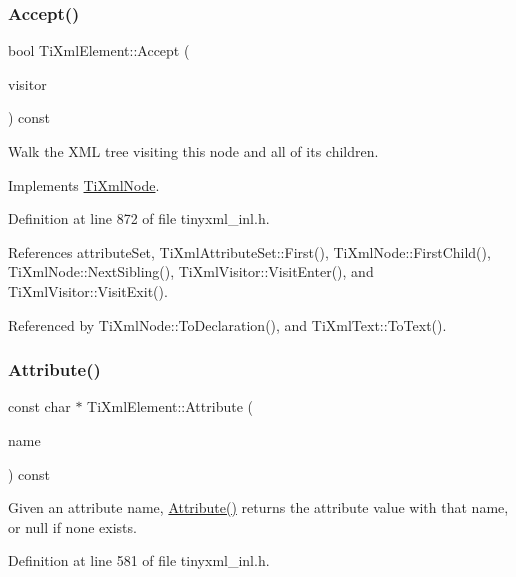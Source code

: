 \subsubsection{\texorpdfstring{Accept()}{Accept()}}
{\footnotesize\ttfamily bool Ti\+Xml\+Element\+::\+Accept (\begin{DoxyParamCaption}\item[{\hyperlink{class_ti_xml_visitor}{Ti\+Xml\+Visitor} $\ast$}]{visitor }\end{DoxyParamCaption}) const\hspace{0.3cm}{\ttfamily [virtual]}}

Walk the X\+ML tree visiting this node and all of its children. 

Implements \hyperlink{class_ti_xml_node_acc0f88b7462c6cb73809d410a4f5bb86}{Ti\+Xml\+Node}.



Definition at line 872 of file tinyxml\+\_\+inl.\+h.



References attribute\+Set, Ti\+Xml\+Attribute\+Set\+::\+First(), Ti\+Xml\+Node\+::\+First\+Child(), Ti\+Xml\+Node\+::\+Next\+Sibling(), Ti\+Xml\+Visitor\+::\+Visit\+Enter(), and Ti\+Xml\+Visitor\+::\+Visit\+Exit().



Referenced by Ti\+Xml\+Node\+::\+To\+Declaration(), and Ti\+Xml\+Text\+::\+To\+Text().

\hypertarget{class_ti_xml_element_a6042f518748f475a7ac4b4e0b509eb05}{}\label{class_ti_xml_element_a6042f518748f475a7ac4b4e0b509eb05} 
\subsubsection{\texorpdfstring{Attribute()}{Attribute()}\hspace{0.1cm}{\footnotesize\ttfamily [1/6]}}
{\footnotesize\ttfamily const char $\ast$ Ti\+Xml\+Element\+::\+Attribute (\begin{DoxyParamCaption}\item[{const char $\ast$}]{name }\end{DoxyParamCaption}) const}

Given an attribute name, \hyperlink{class_ti_xml_element_a6042f518748f475a7ac4b4e0b509eb05}{Attribute()} returns the attribute value with that name, or null if none exists. 

Definition at line 581 of file tinyxml\+\_\+inl.\+h.



